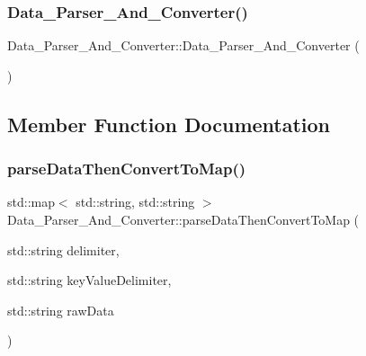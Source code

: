 \subsubsection{\texorpdfstring{Data\+\_\+\+Parser\+\_\+\+And\+\_\+\+Converter()}{Data\_Parser\_And\_Converter()}}
{\footnotesize\ttfamily Data\+\_\+\+Parser\+\_\+\+And\+\_\+\+Converter\+::\+Data\+\_\+\+Parser\+\_\+\+And\+\_\+\+Converter (\begin{DoxyParamCaption}{ }\end{DoxyParamCaption})}







\subsection{Member Function Documentation}
\mbox{\label{class_data___parser___and___converter_a42e1a74db4715d980b83f42d103c25e2}} 
\subsubsection{\texorpdfstring{parse\+Data\+Then\+Convert\+To\+Map()}{parseDataThenConvertToMap()}}
{\footnotesize\ttfamily std\+::map$<$ std\+::string, std\+::string $>$ Data\+\_\+\+Parser\+\_\+\+And\+\_\+\+Converter\+::parse\+Data\+Then\+Convert\+To\+Map (\begin{DoxyParamCaption}\item[{std\+::string}]{delimiter,  }\item[{std\+::string}]{key\+Value\+Delimiter,  }\item[{std\+::string}]{raw\+Data }\end{DoxyParamCaption})\hspace{0.3cm}{\ttfamily [static]}}






